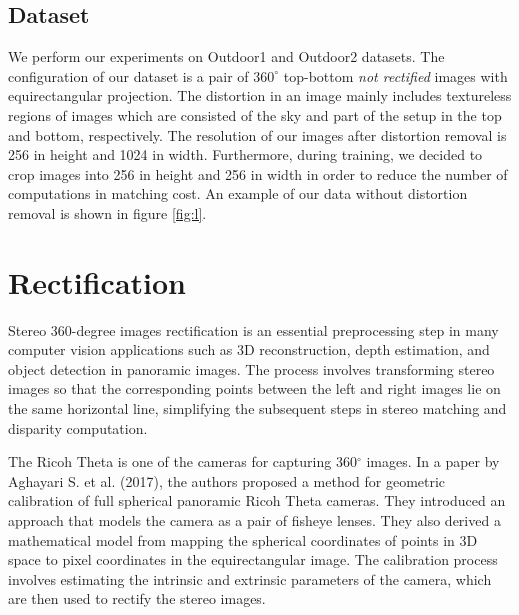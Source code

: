\documentclass[english, LaM, oneside]{sapthesis}%
\begin{document}
\subsection{Dataset}
We perform our experiments on Outdoor1 and Outdoor2 datasets. The configuration of our dataset is a pair of $360^\circ$ top-bottom \textit{not rectified} images with equirectangular projection. The distortion in an image mainly includes textureless regions of images which are consisted of the sky and part of the setup in the top and bottom, respectively. The resolution of our images after distortion removal is 256 in height and 1024 in width. Furthermore, during training, we decided to crop images into 256 in height and 256 in width in order to reduce the number of computations in matching cost. 
\newpage
An example of our data without distortion removal is shown in figure \ref{fig:l}.

\section{Rectification}
Stereo 360-degree images rectification is an essential preprocessing step in many computer vision applications such as 3D reconstruction, depth estimation, and object detection in panoramic images. The process involves transforming stereo images so that the corresponding points between the left and right images lie on the same horizontal line, simplifying the subsequent steps in stereo matching and disparity computation.

The Ricoh Theta is one of the cameras for capturing 360$^\circ$ images. In a paper by Aghayari S. et al. (2017)\cite{ref:rectification1}, the authors proposed a method for geometric calibration of full spherical panoramic Ricoh Theta cameras. They introduced an approach that models the camera as a pair of fisheye lenses. They also derived a mathematical model from mapping the spherical coordinates of points in 3D space to pixel coordinates in the equirectangular image. The calibration process involves estimating the intrinsic and extrinsic parameters of the camera, which are then used to rectify the stereo images.
\end{document}
